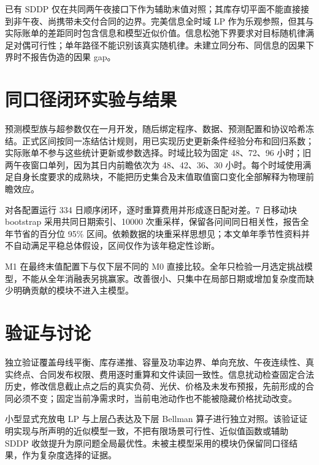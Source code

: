\documentclass[UTF8,a4paper,zihao=-4,fontset=mac]{ctexart}
\begin{document}
已有 SDDP 仅在共同两午夜接口下作为辅助末值对照；其库存切平面不能直接接到非午夜、尚携带未交付合同的边界。完美信息全时域 LP 作为乐观参照，但其与实际账单的差距同时包含信息和模型近似价值。信息松弛下界要求对目标随机律满足对偶可行性\cite{brown}；单年路径不能识别该真实随机律。未建立同分布、同信息的因果下界时不报告伪造的因果 gap。

\section{同口径闭环实验与结果}
预测模型族与超参数仅在一月开发，随后绑定程序、数据、预测配置和协议哈希冻结。正式区间按同一冻结估计规则，用已实现历史更新条件经验分布和回归系数；实际账单不参与这些统计更新或参数选择。时域比较为固定 48、72、96 小时；旧两午夜窗口单列，因为其日内前瞻依次为 48、42、36、30 小时。每个时域使用满足自身长度要求的成熟块，不能把历史集合及末值取值窗口变化全部解释为物理前瞻效应。

对各配置运行 334 日顺序闭环，逐时重算费用并形成逐日配对差。7 日移动块 bootstrap 采用共同日期索引、10000 次重采样，保留各问间同日相关性，报告全年节省的百分位 95\% 区间。依赖数据的块重采样思想见\cite{kunsch}；本文单年季节性资料并不自动满足平稳总体假设，区间仅作为该年稳定性诊断。

M1 在最终末值配置下与仅下层不同的 M0 直接比较。全年只检验一月选定挑战模型，不能从全年消融表另挑赢家。改善很小、只集中在局部日期或增加复杂度而缺少明确贡献的模块不进入主模型。


\section{验证与讨论}
独立验证覆盖母线平衡、库存递推、容量及功率边界、单向充放、午夜连续性、真实终点、合同发布权限、费用逐时重算和文件读回一致性。信息扰动检查固定合法历史，修改信息截止点之后的真实负荷、光伏、价格及未发布预报，先前形成的合同必须不变；固定当前净需求时，当前电池动作也不能被隐藏价格扰动改变。

小型显式充放电 LP 与上层凸表达及下层 Bellman 算子进行独立对照。该验证证明实现与所声明的近似模型一致，不把有限场景可行性、近似值函数或辅助 SDDP 收敛提升为原问题全局最优性。未被主模型采用的模块仍保留同口径结果，作为复杂度选择的证据。

\end{document}
